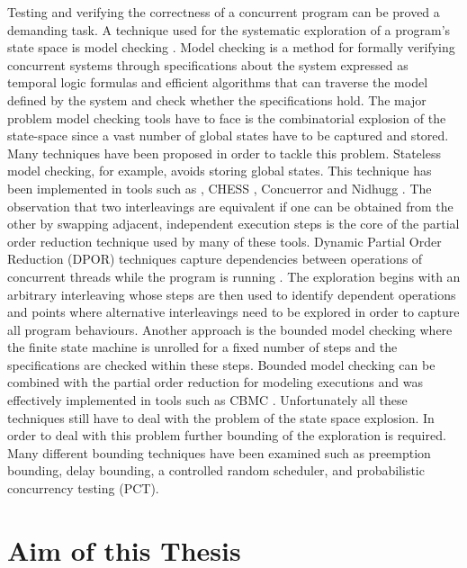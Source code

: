 Testing and verifying the correctness of a concurrent program can be proved a demanding task. 
A technique used for the systematic exploration of a program's state space is model checking \cite{WikipediaModelChecking}.
Model checking is a method for formally verifying concurrent systems through specifications about the system expressed as 
temporal logic formulas and efficient algorithms that can traverse the model defined by the system and check whether
the specifications hold. The major problem model checking tools have to face is the combinatorial explosion of the state-space since
a vast number of global states have to be captured and stored. Many techniques have been proposed in order to tackle this problem.
Stateless model checking, for example, avoids storing global states. This technique has been implemented in tools such as \cite{Gode05}, 
CHESS \cite{Musu08}, Concuerror \cite{Chri13} and Nidhugg \cite{AbdullaAronisAtigJonssonLeonardssonSagonasSMC2015}. The observation that two 
interleavings are equivalent if one can be obtained from the other by swapping adjacent, independent execution steps is the core of the partial
order reduction \cite{Valmari1991, Peled1993, Godefroid1996,POR} technique used by many of these tools. Dynamic Partial Order Reduction (DPOR) techniques
capture dependencies between operations of concurrent threads while the program is running \cite{FlanaganDPOR}. The exploration begins with an arbitrary interleaving whose steps are then
used to identify dependent operations and points where alternative interleavings need to
be explored in order to capture all program behaviours. Another approach is the bounded model checking \cite{BoundedModelChecking} where the finite state
machine is unrolled for a fixed number of steps and the specifications are checked within these steps. Bounded model checking can be combined with the partial
order reduction for modeling executions \cite{PORinBMC} and was effectively implemented in tools such as CBMC \cite{CBMC}.
Unfortunately all these techniques still have to deal with the problem of the state space explosion. In order to deal with this problem further
bounding of the exploration is required. Many different bounding techniques have been examined \cite{Thomson} such as preemption bounding, delay
bounding, a controlled random scheduler, and probabilistic concurrency testing (PCT).

\section{Aim of this Thesis}

